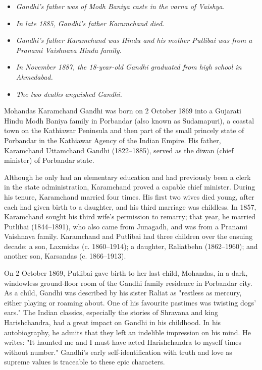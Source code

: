 \begin{itemize}
\item
  \emph{Gandhi's father was of Modh Baniya caste in the varna of
  Vaishya.}
\item
  \emph{In late 1885, Gandhi's father Karamchand died.}
\item
  \emph{Gandhi's father Karamchand was Hindu and his mother Putlibai was
  from a Pranami Vaishnava Hindu family.}
\item
  \emph{In November 1887, the 18-year-old Gandhi graduated from high
  school in Ahmedabad.}
\item
  \emph{The two deaths anguished Gandhi.}
\end{itemize}

Mohandas Karamchand Gandhi was born on 2 October 1869 into a Gujarati
Hindu Modh Baniya family in Porbandar (also known as Sudamapuri), a
coastal town on the Kathiawar Peninsula and then part of the small
princely state of Porbandar in the Kathiawar Agency of the Indian
Empire. His father, Karamchand Uttamchand Gandhi (1822--1885), served as
the diwan (chief minister) of Porbandar state.

Although he only had an elementary education and had previously been a
clerk in the state administration, Karamchand proved a capable chief
minister. During his tenure, Karamchand married four times. His first
two wives died young, after each had given birth to a daughter, and his
third marriage was childless. In 1857, Karamchand sought his third
wife's permission to remarry; that year, he married Putlibai
(1844--1891), who also came from Junagadh, and was from a Pranami
Vaishnava family. Karamchand and Putlibai had three children over the
ensuing decade: a son, Laxmidas (c. 1860--1914); a daughter, Raliatbehn
(1862--1960); and another son, Karsandas (c. 1866--1913).

On 2 October 1869, Putlibai gave birth to her last child, Mohandas, in a
dark, windowless ground-floor room of the Gandhi family residence in
Porbandar city. As a child, Gandhi was described by his sister Raliat as
"restless as mercury, either playing or roaming about. One of his
favourite pastimes was twisting dogs' ears." The Indian classics,
especially the stories of Shravana and king Harishchandra, had a great
impact on Gandhi in his childhood. In his autobiography, he admits that
they left an indelible impression on his mind. He writes: "It haunted me
and I must have acted Harishchandra to myself times without number."
Gandhi's early self-identification with truth and love as supreme values
is traceable to these epic characters.

